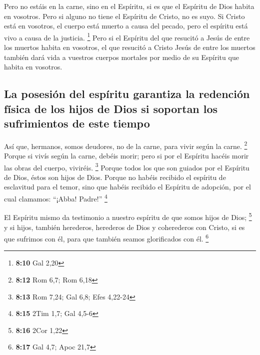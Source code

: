  Pero no estáis en la carne, sino en el Espíritu, si es
que el Espíritu de Dios habita en vosotros. Pero si alguno no tiene el
Espíritu de Cristo, no es suyo.  Si Cristo está en
vosotros, el cuerpo está muerto a causa del pecado, pero el espíritu
está vivo a causa de la justicia. \footnote{\textbf{8:10} Gal 2,20}
 Pero si el Espíritu del que resucitó a Jesús de entre
los muertos habita en vosotros, el que resucitó a Cristo Jesús de entre
los muertos también dará vida a vuestros cuerpos mortales por medio de
su Espíritu que habita en vosotros.

\hypertarget{la-posesiuxf3n-del-espuxedritu-garantiza-la-redenciuxf3n-fuxedsica-de-los-hijos-de-dios-si-soportan-los-sufrimientos-de-este-tiempo}{%
\subsection{La posesión del espíritu garantiza la redención física de
los hijos de Dios si soportan los sufrimientos de este
tiempo}\label{la-posesiuxf3n-del-espuxedritu-garantiza-la-redenciuxf3n-fuxedsica-de-los-hijos-de-dios-si-soportan-los-sufrimientos-de-este-tiempo}}

 Así que, hermanos, somos deudores, no de la carne, para
vivir según la carne. \footnote{\textbf{8:12} Rom 6,7; Rom 6,18}
 Porque si vivís según la carne, debéis morir; pero si
por el Espíritu hacéis morir las obras del cuerpo, viviréis. \footnote{\textbf{8:13}
  Rom 7,24; Gal 6,8; Efes 4,22-24}  Porque todos los que
son guiados por el Espíritu de Dios, éstos son hijos de Dios.
 Porque no habéis recibido el espíritu de esclavitud para
el temor, sino que habéis recibido el Espíritu de adopción, por el cual
clamamos: ``¡Abba! Padre!'' \footnote{\textbf{8:15} 2Tim 1,7; Gal 4,5-6}

 El Espíritu mismo da testimonio a nuestro espíritu de
que somos hijos de Dios; \footnote{\textbf{8:16} 2Cor 1,22}
 y si hijos, también herederos, herederos de Dios y
coherederos con Cristo, si es que sufrimos con él, para que también
seamos glorificados con él. \footnote{\textbf{8:17} Gal 4,7; Apoc 21,7}

